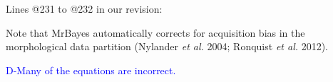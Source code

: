 \documentclass[11pt]{letter}
\begin{document}
\begin{letter}{}
Lines @231 to @232 in our revision:

\hfill\begin{minipage}{\dimexpr\textwidth-1cm}
Note that MrBayes automatically corrects for acquisition bias in the morphological data partition (Nylander \textit{et al.} 2004; Ronquist \textit{et al.} 2012).
\end{minipage}




\textcolor{blue}{D-Many of the equations are incorrect.} %


\end{letter}
\end{document}
